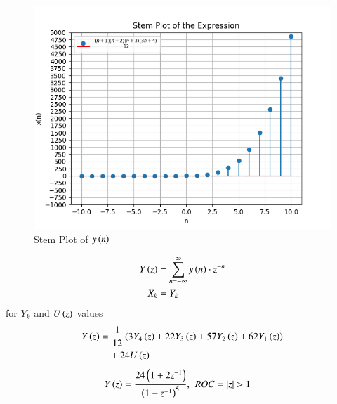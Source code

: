 \documentclass[journal,12pt,twocolumn]{IEEEtran}
\theoremstyle{remark}
\begin{document}
\begin{enumerate}[label=\arabic*.]
\begin{figure}[h]
    \includegraphics[width=1\columnwidth]{Figure_2.png}
    \caption{Stem Plot of $y\left(n\right)$}
\end{figure}

\begin{align}
    Y\left(z\right) &= \sum_{n=-\infty}^\infty y\left(n\right)\cdot z^{-n}\\
    X_k&=Y_k\label{eq:11.9.5.26.6} 
\end{align}
 for $Y_k$ and $U\left(z\right)$ values 
\begin{align}
    Y\left(z\right) &=\frac{1}{12}\left(3Y_4\left(z\right) + 22Y_3\left(z\right) + 57Y_2\left(z\right) + 62Y_1\left(z\right)\right) \\
&\quad + 24U\left(z\right) \notag 
\end{align}
\begin{align}
        Y\brak{z} &= \frac{24 \brak{1+2z^{-1}}}{\brak{1-z^{-1}}^5} ,\hspace{4pt} ROC=|z|>1
\end{align}
\end{enumerate}
\end{document}
